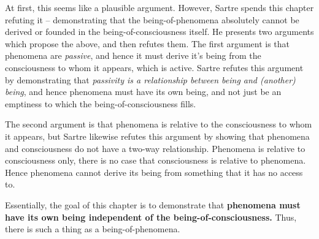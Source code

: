 At first, this seems like a plausible argument. However, Sartre spends this chapter refuting it -- demonstrating that the being-of-phenomena absolutely cannot be derived or founded in the being-of-consciousness itself. He presents two arguments which propose the above, and then refutes them. The first argument is that phenomena are \emph{passive}, and hence it must derive it's being from the consciousness to whom it appears, which is active. Sartre refutes this argument by demonstrating that \emph{passivity is a relationship between being and (another) being}, and hence phenomena must have its own being, and not just be an emptiness to which the being-of-consciousness fills.

The second argument is that phenomena is relative to the consciousness to whom it appears, but Sartre likewise refutes this argument by showing that phenomena and consciousness do not have a two-way relationship. Phenomena is relative to consciousness only, there is no case that consciousness is relative to phenomena. Hence phenomena cannot derive its being from something that it has no access to.

Essentially, the goal of this chapter is to demonstrate that \textbf{phenomena must have its own being independent of the being-of-consciousness.} Thus, there is such a thing as a being-of-phenomena.

